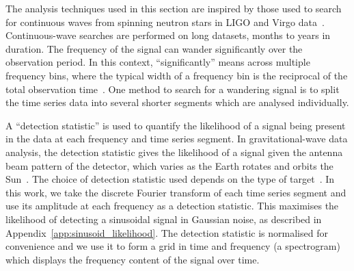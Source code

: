 \documentclass[paper-main.tex]{subfiles}
\begin{document}
The analysis techniques used in this section are inspired by those used to search for continuous waves from spinning neutron stars in LIGO and Virgo data~\cite{SuvorovaEtAl:2016,SuvorovaEtAl:2017}. 
Continuous-wave searches are performed on long datasets, months to years in duration. 
The frequency of the signal can wander significantly over the observation period. 
In this context, ``significantly'' means across multiple frequency bins, where the typical width of a frequency bin is the reciprocal of the total observation time~\cite{JKS:1998,ScoX1O2Viterbi:2019}.
One method to search for a wandering signal is to split the time series data into several shorter segments which are analysed individually.%

A ``detection statistic'' is used to quantify the likelihood of a signal being present in the data at each frequency and time series segment. 
In gravitational-wave data analysis, the detection statistic gives the likelihood of a signal given the antenna beam pattern of the detector, which varies as the Earth rotates and orbits the Sun~\cite{JKS:1998}. 
The choice of detection statistic used depends on the type of target~\cite{JKS:1998,SuvorovaEtAl:2017}.
In this work, we take the discrete Fourier transform of each time series segment and use its amplitude at each frequency as a detection statistic.
This maximises the likelihood of detecting a sinusoidal signal in Gaussian noise, as described in Appendix~\ref{app:sinusoid_likelihood}. 
The detection statistic is normalised for convenience and we use it to form a grid in time and frequency (a spectrogram) which displays the frequency content of the signal over time. 
\end{document}
